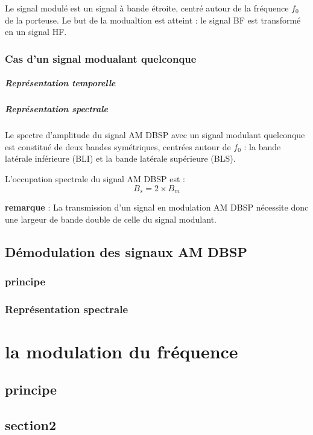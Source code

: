 \documentclass[12pt,a4paper,hidelinks,oneside]{book}
\begin{document}
Le signal modulé est un signal à bande étroite, centré autour de la fréquence $f_{0}$ de la porteuse. Le but
de la modualtion est atteint : le signal BF est transformé en un signal HF.

\subsection{Cas d’un signal modualant quelconque}
\paragraph{Représentation temporelle}
\paragraph{Représentation spectrale }
Le spectre d’amplitude du signal AM DBSP avec un signal modulant quelconque est constitué de deux
bandes symétriques, centrées autour de $f_{0}$ : la bande latérale inférieure (BLI) et la bande latérale
supérieure (BLS).

L’occupation spectrale du signal AM DBSP est :
\begin{equation}
B_{s}=2\times B_{m}
\end{equation}

\noindent\textbf{remarque} : La transmission d’un signal en modulation AM DBSP nécessite donc une largeur de bande double de
celle du signal modulant.

\section{Démodulation des signaux AM DBSP}
\subsection{principe}
\subsection{Représentation spectrale}


\chapter{la modulation du fréquence}
\section{principe}
\section{section2}
\end{document}
